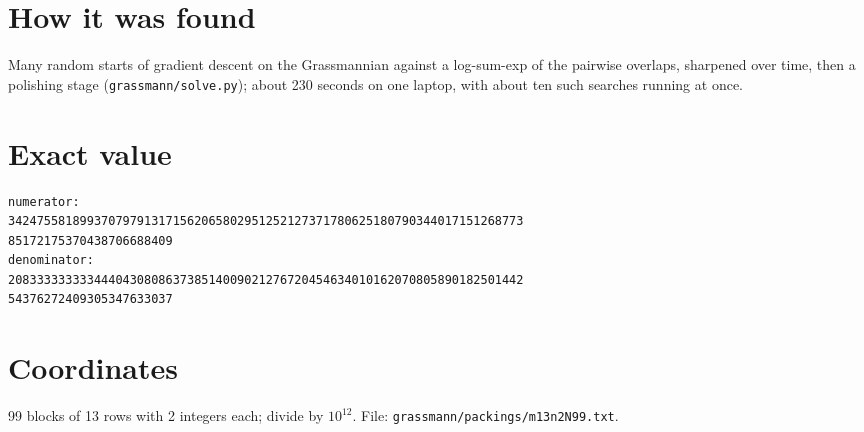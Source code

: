 \documentclass[11pt,a4paper]{article}
\begin{document}
\section{How it was found}
Many random starts of gradient descent on the Grassmannian against a log-sum-exp of the pairwise overlaps, sharpened over time, then a polishing stage (\texttt{grassmann/solve.py}); about 230 seconds on one laptop, with about ten such searches running at once.


\appendix
\section{Exact value}
{\small
\begin{verbatim}
numerator:
342475581899370797913171562065802951252127371780625180790344017151268773
85172175370438706688409
denominator:
208333333333444043080863738514009021276720454634010162070805890182501442
54376272409305347633037
\end{verbatim}}

\section{Coordinates}
99 blocks of 13 rows with 2 integers each; divide by $10^{12}$. File: \texttt{grassmann/packings/m13n2N99.txt}.
{\tiny
\begin{multicols}{4}
\end{multicols}}
\end{document}
